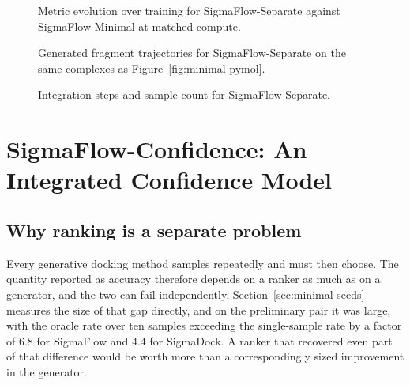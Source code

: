 \documentclass[11pt,a4paper]{report}
\theoremstyle{plain}
\theoremstyle{definition}
\theoremstyle{remark}
\newif\ifdraftmode
\newcommand{\figplaceholder}[3]{%
  \begin{figure}[htbp]
  \centering
  \ifdraftmode
    \begin{tcolorbox}[
      width=0.92\textwidth, colback=PanelGrey, colframe=DraftGrey,
      boxrule=0.5pt, sharp corners, halign=flush left]
      \small\sffamily
      \textbf{\color{DraftBlue}FIGURE PLACEHOLDER}\\[3pt]
      #3
    \end{tcolorbox}
  \else
    \fbox{\parbox{0.9\textwidth}{\centering\vspace{2cm}[figure]\vspace{2cm}}}
  \fi
  \caption{#2}
  \label{#1}
  \end{figure}}
\begin{document}
\figplaceholder{fig:separate-curves}
{Metric evolution over training for SigmaFlow-Separate against
SigmaFlow-Minimal at matched compute.}
{Same three-panel layout as Figure~\ref{fig:minimal-curves}, with the two
SigmaFlow variants as the two series and SigmaDock retained as a faint
reference line. Because the budget is matched in compute rather than in steps,
plot against wall-clock hours as the primary axis and mark the achieved step
count of each arm at its endpoint.}

\figplaceholder{fig:separate-pymol}
{Generated fragment trajectories for SigmaFlow-Separate on the same complexes
as Figure~\ref{fig:minimal-pymol}.}
{Identical rendering protocol, camera and colour scheme to
Figure~\ref{fig:minimal-pymol}, on the same complexes, so that the two figures
can be compared panel by panel. Any difference in orientation behaviour should
be visible without consulting the numbers.}

\figplaceholder{fig:separate-nfe-seeds}
{Integration steps and sample count for SigmaFlow-Separate.}
{Two panels reproducing the protocols of Figures~\ref{fig:minimal-nfe} and
\ref{fig:minimal-seeds} for this variant, so that the inference-time
characterisation is available for every model in the thesis rather than for the
baseline alone.}

\chapter{SigmaFlow-Confidence: An Integrated Confidence Model}
\label{ch:confidence}

\section{Why ranking is a separate problem}

Every generative docking method samples repeatedly and must then choose. The
quantity reported as accuracy therefore depends on a ranker as much as on a
generator, and the two can fail independently. Section~\ref{sec:minimal-seeds}
measures the size of that gap directly, and on the preliminary pair it was
large, with the oracle rate over ten samples exceeding the single-sample rate
by a factor of $6.8$ for SigmaFlow and $4.4$ for SigmaDock. A ranker that
recovered even part of that difference would be worth more than a
correspondingly sized improvement in the generator.
\end{document}
